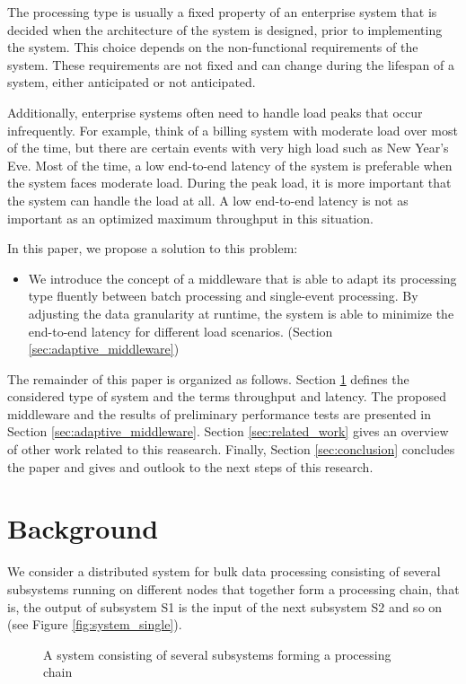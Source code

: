 The processing type is usually a fixed property of an enterprise system that is decided when the architecture of the system is designed, prior to implementing the system. This choice depends on the non-functional requirements of the system. These requirements are not fixed and can change during the lifespan of a system, either anticipated or not anticipated.

Additionally, enterprise systems often need to handle load peaks that occur infrequently. For example, think of a billing system with moderate load over most of the time, but there are certain events with very high load such as New Year's Eve. Most of the time, a low end-to-end latency of the system is preferable when the system faces moderate load. During the peak load, it is more important that the system can handle the load at all. A low end-to-end latency is not as important as an optimized maximum throughput in this situation.

In this paper, we propose a solution to this problem:

\begin{itemize}
	\item We introduce the concept of a middleware that is able to adapt its processing type fluently between batch processing and single-event processing. By adjusting the data granularity at runtime, the system is able to minimize the end-to-end latency for different load scenarios. (Section \ref{sec:adaptive_middleware})
\end{itemize}

The remainder of this paper is organized as follows. Section \ref{sec:background} defines the considered type of system and the terms throughput and latency. The proposed middleware and the results of preliminary performance tests are presented in Section \ref{sec:adaptive_middleware}. Section \ref{sec:related_work} gives an overview of other work related to this reasearch. Finally, Section \ref{sec:conclusion} concludes the paper and gives and outlook to the next steps of this research.

\section{Background}\label{sec:background}
We consider a distributed system for bulk data processing consisting of several subsystems running on different nodes that together form a processing chain, that is, the output of subsystem S1 is the input of the next subsystem S2 and so on (see Figure \ref{fig:system_single}).
\begin{figure}[h!]
	\centering
	\mbox{}
	\mbox{}
	\caption{A system consisting of several subsystems forming a processing chain}
\end{figure}

